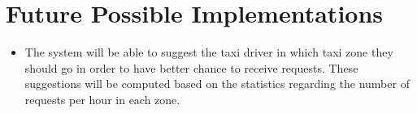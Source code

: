 \section{Future Possible Implementations}
\begin{itemize}
	\item The system will be able to suggest the taxi driver in which taxi zone they should go in order to have better chance to receive requests. These suggestions will be computed based on the statistics regarding the number of requests per hour in each zone.
\end{itemize}
